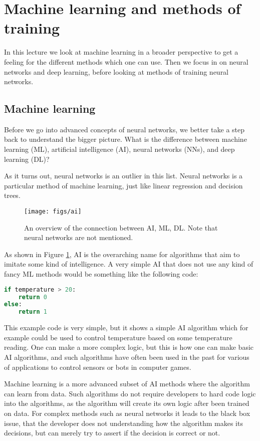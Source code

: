 \documentclass[12pt,a4paper]{article} %
\numberwithin{equation}{section}
\begin{document}
\section{Machine learning and methods of training}
	In this lecture we look at machine learning in a broader perspective to get a feeling for the different methods which one can use. Then we focus in on neural networks and deep learning, before looking at methods of training neural networks.
	
	\subsection{Machine learning}
		Before we go into advanced concepts of neural networks, we better take a step back to understand the bigger picture. What is the difference between machine learning (ML), artificial intelligence (AI), neural networks (NNs), and deep learning (DL)?
		
		As it turns out, neural networks is an outlier in this list. Neural networks is a particular method of machine learning, just like linear regression and decision trees. 
		\begin{figure}
			\centering
			\texttt{[image: figs/ai]}
			\caption{An overview of the connection between AI, ML, DL. Note that neural networks are not mentioned.}
			\label{fig:ai}
		\end{figure}
		
		As shown in Figure \ref{fig:ai}, AI is the overarching name for algorithms that aim to imitate some kind of intelligence. A very simple AI that does not use any kind of fancy ML methods would be something like the following code:
		\begin{lstlisting}[language=Python]
if temperature > 20: 
	return 0
else:
	return 1
		\end{lstlisting}
		This example code is very simple, but it shows a simple AI algorithm which for example could be used to control temperature based on some temperature reading. One can make a more complex logic, but this is how one can make basic AI algorithms, and such algorithms have often been used in the past for various of applications to control sensors or bots in computer games.
		
		Machine learning is a more advanced subset of AI methods where the algorithm can learn from data. Such algorithms do not require developers to hard code logic into the algorithms, as the algorithm will create its own logic after been trained on data. For complex methods such as neural networks it leads to the black box issue, that the developer does not understanding how the algorithm makes its decisions, but can merely try to assert if the decision is correct or not.
		
\end{document}
